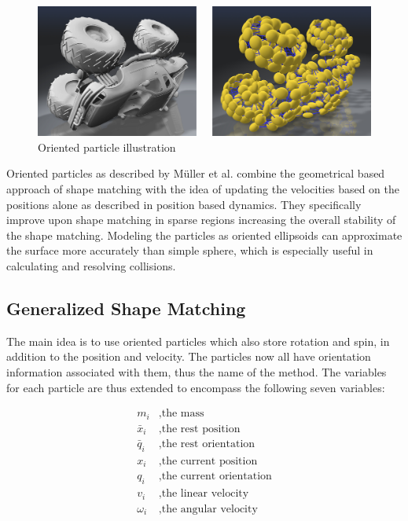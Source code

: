 \begin{figure}[htb]
\centering
\includegraphics[width=.8\textwidth]{images/oriented_particles_illustration.png}
\caption[Oriented particle illustration]{Oriented particle illustration\cite{Muller:2011gn}}
\label{img:oriented_particles_illustration}
\end{figure}

Oriented particles as described by M{\"u}ller et al. \cite{Muller:2011gn} combine the geometrical based approach of shape matching with the idea of updating the velocities based on the positions alone as described in position based dynamics. They specifically improve upon shape matching in sparse regions increasing the overall stability of the shape matching. Modeling the particles as oriented ellipsoids can approximate the surface more accurately than simple sphere, which is especially useful in calculating and resolving collisions.

\subsection{Generalized Shape Matching}
The main idea is to use oriented particles which also store rotation and spin, in addition to the position and velocity. The particles now all have orientation information associated with them, thus the name of the method. The variables for each particle are thus extended to encompass the following seven variables:

\begin{align*}
m_i &, \text{the mass} \\
\bar{x}_i &, \text{the rest position} \\
\bar{q}_i &, \text{the rest orientation} \\
x_i &, \text{the current position} \\
q_i &, \text{the current orientation} \\
v_i &, \text{the linear velocity} \\
\omega_i &, \text{the angular velocity}
\end{align*}


